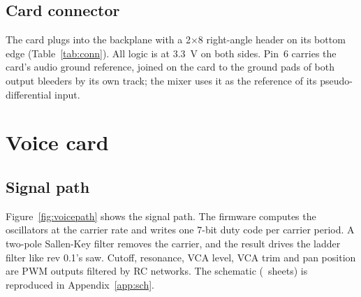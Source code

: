 \documentclass[11pt,a4paper]{article}
\newcommand{\file}[1]{\texttt{#1}}
\begin{document}
\subsection{Card connector}
The card plugs into the backplane with a 2$\times$8 right-angle header on its bottom edge (Table~\ref{tab:conn}). All
logic is at \SI{3.3}{V} on both sides. Pin~6 carries the card's audio ground reference, joined on the card to the
ground pads of both output bleeders by its own track; the mixer uses it as the reference of its pseudo-differential
input.

\begin{table}[htbp]
\centering\small
\caption{Backplane connector, card side (J1 of \file{hw/voice.py}) and slot side (socket of \file{hw/backplane.py});
generated. Slot~1 differs on pins 3, 4, 14 and 15 (the effects slot, Section~\ref{sec:fxslot}).}\label{tab:conn}

\end{table}

\section{Voice card}\label{sec:voice}

\subsection{Signal path}
Figure~\ref{fig:voicepath} shows the signal path. The firmware computes the oscillators at the carrier rate and writes
one 7-bit duty code per carrier period. A two-pole Sallen-Key filter removes the carrier, and the result drives the
ladder filter like rev 0.1's saw. Cutoff, resonance, VCA level, VCA trim and pan position are PWM outputs filtered by
RC networks. The schematic (\statVoiceSheets\ sheets) is reproduced in Appendix~\ref{app:sch}.
\end{document}
